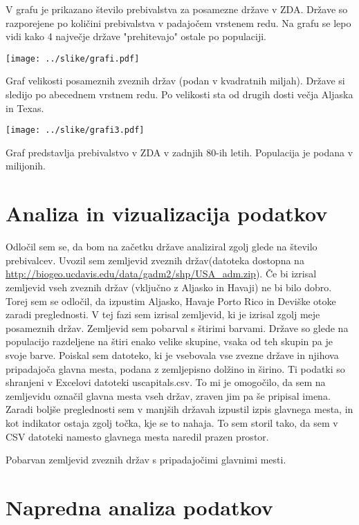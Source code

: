 \documentclass[11pt,a4paper]{article}
\begin{document}
V grafu je prikazano število prebivalstva za posamezne države v ZDA. Države so razporejene po količini prebivalstva v padajočem vrstenem redu. Na grafu se lepo vidi kako 4 največje države "prehitevajo" ostale po populaciji.

\texttt{[image: ../slike/grafi.pdf]}

Graf velikosti posameznih zveznih držav (podan v kvadratnih miljah). Države si sledijo po abecednem vrstnem redu. Po velikosti sta od drugih dosti večja Aljaska in Texas.

\texttt{[image: ../slike/grafi3.pdf]}

Graf predstavlja prebivalstvo v ZDA v zadnjih 80-ih letih. Populacija je podana v milijonih.

\pagebreak

\section{Analiza in vizualizacija podatkov}

Odločil sem se, da bom na začetku države analiziral zgolj glede na število prebivalcev. Uvozil sem zemljevid zveznih držav(datoteka dostopna na \url{http://biogeo.ucdavis.edu/data/gadm2/shp/USA_adm.zip}). Če bi izrisal zemljevid vseh zveznih držav (vključno z Aljasko in Havaji) ne bi bilo dobro. Torej sem se odločil, da izpustim Aljasko, Havaje Porto Rico in Deviške otoke zaradi
preglednosti. V tej fazi sem izrisal zemljevid, ki je izrisal zgolj meje posameznih držav.
Zemljevid sem pobarval s štirimi barvami. Države so glede na populacijo razdeljene na štiri enako velike skupine, vsaka od teh skupin pa je svoje barve.
Poiskal sem datoteko, ki je vsebovala vse zvezne države in njihova pripadajoča glavna mesta, podana z zemljepisno dolžino in širino. Ti podatki so shranjeni v Excelovi datoteki uscapitals.csv. To mi je omogočilo, da sem na zemljevidu označil glavna mesta vseh držav, zraven jim pa še pripisal imena. Zaradi boljše preglednosti sem v manjših državah izpustil izpis glavnega mesta, in kot indikator ostaja zgolj točka, kje se to nahaja. To sem storil tako, da sem v CSV datoteki namesto glavnega mesta naredil prazen prostor.


Pobarvan zemljevid zveznih držav s pripadajočimi glavnimi mesti.

\newpage
\section{Napredna analiza podatkov}
\end{document}
